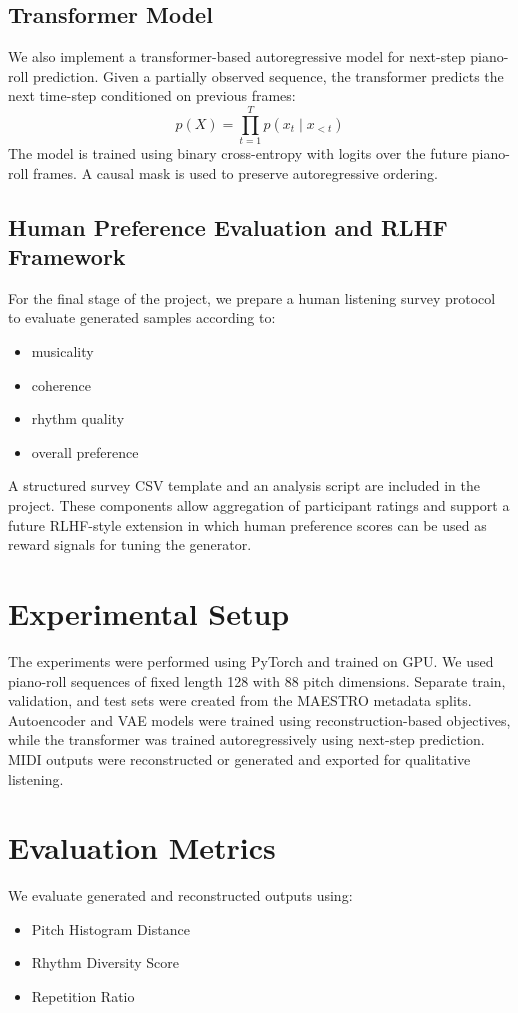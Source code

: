 \documentclass[conference]{IEEEtran}
\begin{document}
\subsection{Transformer Model}
We also implement a transformer-based autoregressive model for next-step piano-roll prediction. Given a partially observed sequence, the transformer predicts the next time-step conditioned on previous frames:
\[
p(X)=\prod_{t=1}^{T} p(x_t \mid x_{<t})
\]
The model is trained using binary cross-entropy with logits over the future piano-roll frames. A causal mask is used to preserve autoregressive ordering.

\subsection{Human Preference Evaluation and RLHF Framework}
For the final stage of the project, we prepare a human listening survey protocol to evaluate generated samples according to:
\begin{itemize}
    \item musicality
    \item coherence
    \item rhythm quality
    \item overall preference
\end{itemize}
A structured survey CSV template and an analysis script are included in the project. These components allow aggregation of participant ratings and support a future RLHF-style extension in which human preference scores can be used as reward signals for tuning the generator.

\section{Experimental Setup}
The experiments were performed using PyTorch and trained on GPU. We used piano-roll sequences of fixed length 128 with 88 pitch dimensions. Separate train, validation, and test sets were created from the MAESTRO metadata splits. Autoencoder and VAE models were trained using reconstruction-based objectives, while the transformer was trained autoregressively using next-step prediction. MIDI outputs were reconstructed or generated and exported for qualitative listening.

\section{Evaluation Metrics}
We evaluate generated and reconstructed outputs using:
\begin{itemize}
    \item Pitch Histogram Distance
    \item Rhythm Diversity Score
    \item Repetition Ratio
\end{itemize}
\end{document}
